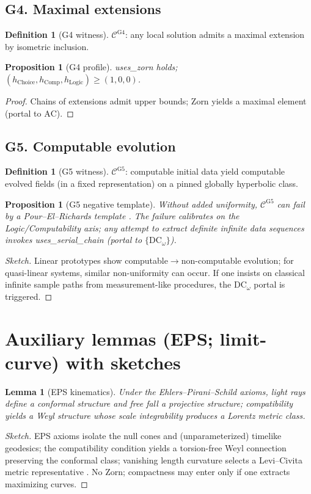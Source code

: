 \documentclass[11pt]{article}
\newtheorem{lemma}[theorem]{Lemma}
\newtheorem{proposition}[theorem]{Proposition}
\theoremstyle{definition}
\newtheorem{definition}[theorem]{Definition}
\theoremstyle{remark}
\newcommand{\AC}{\mathrm{AC}}
\newcommand{\DCw}{\mathrm{DC}_\omega}
\newcommand{\hChoice}{h_{\mathrm{Choice}}}    %
\newcommand{\hComp}{h_{\mathrm{Comp}}}        %
\newcommand{\hLogic}{h_{\mathrm{Logic}}}      %
\begin{document}
\subsection*{G4. Maximal extensions}
\begin{definition}[G4 witness]
$\mathcal{C}^{\mathrm{G4}}$: any local solution admits a maximal extension by isometric inclusion.
\end{definition}
\begin{proposition}[G4 profile]\label{prop:G4}
\textsf{uses\_zorn} holds; $(\hChoice,\hComp,\hLogic)\ge(1,0,0)$.
\end{proposition}
\begin{proof}
Chains of extensions admit upper bounds; Zorn yields a maximal element (portal to $\AC$).
\end{proof}

\subsection*{G5. Computable evolution}
\begin{definition}[G5 witness]
$\mathcal{C}^{\mathrm{G5}}$: computable initial data yield computable evolved fields (in a fixed representation) on a pinned globally hyperbolic class.
\end{definition}
\begin{proposition}[G5 negative template]\label{prop:G5}
Without added uniformity, $\mathcal{C}^{\mathrm{G5}}$ can fail by a Pour--El--Richards template \cite{PourElRichards1989}. The failure calibrates on the Logic/Computability axis; any attempt to extract definite infinite data sequences invokes \textsf{uses\_serial\_chain} (portal to $\{\DCw\}$).
\end{proposition}
\begin{proof}[Sketch]
Linear prototypes show computable$\to$non-computable evolution; for quasi-linear systems, similar non-uniformity can occur. If one insists on classical infinite sample paths from measurement-like procedures, the $\DCw$ portal is triggered.
\end{proof}

\section{Auxiliary lemmas (EPS; limit-curve) with sketches}
\begin{lemma}[EPS kinematics]\label{lem:EPS}
Under the Ehlers--Pirani--Schild axioms, light rays define a conformal structure and free fall a projective structure; compatibility yields a Weyl structure whose scale integrability produces a Lorentz metric class.
\end{lemma}
\begin{proof}[Sketch]
EPS axioms isolate the null cones and (unparameterized) timelike geodesics; the compatibility condition yields a torsion-free Weyl connection preserving the conformal class; vanishing length curvature selects a Levi--Civita metric representative \cite{EPS1972}. No Zorn; compactness may enter only if one extracts maximizing curves.
\end{proof}
\end{document}
